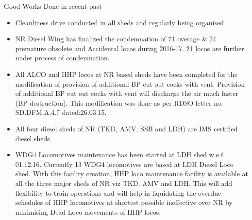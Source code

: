 \documentclass[
  ignorenonframetext,
]{beamer}
\begin{document}
\begin{frame}{Good Works Done in recent past}
\protect\hypertarget{good-works-done-in-recent-past}{}
\begin{itemize}[<+->]
\item
  Cleanliness drive conducted in all sheds and regularly being organised
\item
  NR Diesel Wing has finalized the condemnation of 71 overage \& 24
  premature obsolete and Accidental locos during 2016-17. 21 locos are
  further under process of condemnation.
\item
  All ALCO and HHP locos at NR based sheds have been completed for the
  modification of provision of additional BP cut out cocks with vent.
  Provision of additional BP cut out cocks with vent will discharge the
  air much faster (BP destruction). This modification was done as per
  RDSO letter no. SD.DFM.A.4.7 dated:26.03.15.
\item
  All four diesel sheds of NR (TKD, AMV, SSB and LDH) are IMS certified
  diesel sheds
\item
  WDG4 Locomotives maintenance has been started at LDH shed w.e.f.
  01.12.16. Currently 13 WDG4 locomotives are based at LDH Diesel Loco
  shed. With this facility creation, HHP loco maintenance facility is
  available at all the three major sheds of NR viz TKD, AMV and LDH.
  This will add flexibility to train operations and will help in
  liquidating the overdue schedules of HHP locomotives at shortest
  possible ineffective over NR by minimising Dead Loco movements of HHP
  locos.
\end{itemize}
\end{frame}
\end{document}
